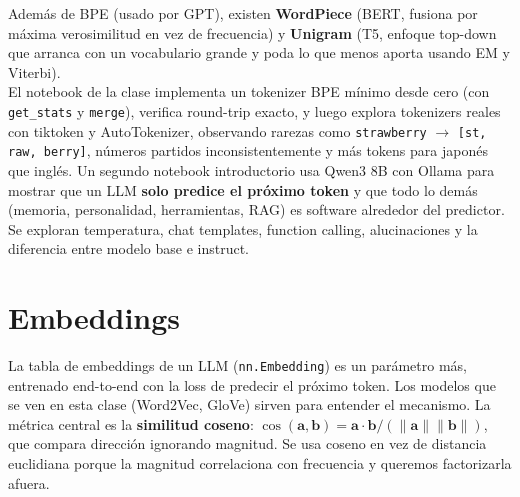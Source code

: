 \documentclass[11pt,a4paper]{article}
\begin{document}
Adem\'as de BPE (usado por GPT), existen \textbf{WordPiece} (BERT, fusiona por m\'axima verosimilitud en vez de frecuencia) y \textbf{Unigram} (T5, enfoque top-down que arranca con un vocabulario grande y poda lo que menos aporta usando EM y Viterbi). \\[1ex]

El notebook de la clase implementa un tokenizer BPE m\'inimo desde cero (con \texttt{get\_stats} y \texttt{merge}), verifica round-trip exacto, y luego explora tokenizers reales con tiktoken y AutoTokenizer, observando rarezas como \texttt{strawberry} $\to$ \texttt{[st, raw, berry]}, n\'umeros partidos inconsistentemente y m\'as tokens para japon\'es que ingl\'es. Un segundo notebook introductorio usa Qwen3 8B con Ollama para mostrar que un LLM \textbf{solo predice el pr\'oximo token} y que todo lo dem\'as (memoria, personalidad, herramientas, RAG) es software alrededor del predictor. Se exploran temperatura, chat templates, function calling, alucinaciones y la diferencia entre modelo base e instruct. \\[1ex]

\section{Embeddings}

La tabla de embeddings de un LLM (\texttt{nn.Embedding}) es un par\'ametro m\'as, entrenado end-to-end con la loss de predecir el pr\'oximo token. Los modelos que se ven en esta clase (Word2Vec, GloVe) sirven para entender el mecanismo. La m\'etrica central es la \textbf{similitud coseno}: $\cos(\mathbf{a}, \mathbf{b}) = \mathbf{a} \cdot \mathbf{b} / (\|\mathbf{a}\| \|\mathbf{b}\|)$, que compara direcci\'on ignorando magnitud. Se usa coseno en vez de distancia euclidiana porque la magnitud correlaciona con frecuencia y queremos factorizarla afuera. \\[1ex]
\end{document}
